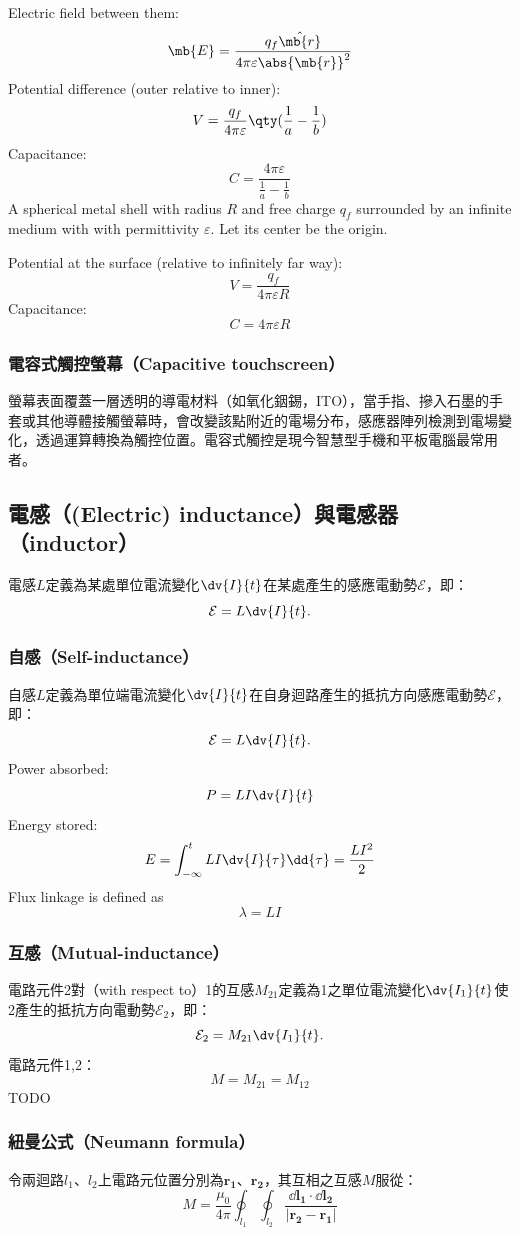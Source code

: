 \documentclass[a4paper,12pt]{report}
\begin{document}
\begin{itemize}
Electric field between them:
\[\mb{E}=\frac{q_f\hat{\mb{r}}}{4\pi\varepsilon\abs{\mb{r}}^2}\]
Potential difference (outer relative to inner):
\[V=\frac{q_f}{4\pi\varepsilon}\qty(\frac{1}{a}-\frac{1}{b})\]
Capacitance:
\[C=\frac{4\pi\varepsilon}{\frac{1}{a}-\frac{1}{b}}\]
A spherical metal shell with radius $R$ and free charge $q_f$ surrounded by an infinite medium with with permittivity $\varepsilon$. Let its center be the origin.

Potential at the surface (relative to infinitely far way):
\[V=\frac{q_f}{4\pi\varepsilon R}\]
Capacitance:
\[C=4\pi\varepsilon R\]
\subsubsection{電容式觸控螢幕（Capacitive touchscreen）}
螢幕表面覆蓋一層透明的導電材料（如氧化銦錫，ITO），當手指、摻入石墨的手套或其他導體接觸螢幕時，會改變該點附近的電場分布，感應器陣列檢測到電場變化，透過運算轉換為觸控位置。電容式觸控是現今智慧型手機和平板電腦最常用者。
\subsection{電感（(Electric) inductance）與電感器（inductor）}
電感$L$定義為某處單位電流變化$\dv{I}{t}$在某處產生的感應電動勢$\mathcal{E}$，即：
\[\mathcal{E}=L\dv{I}{t}.\]
\subsubsection{自感（Self-inductance）}
自感$L$定義為單位端電流變化$\dv{I}{t}$在自身迴路產生的抵抗方向感應電動勢$\mathcal{E}$，即：
\[\mathcal{E}=L\dv{I}{t}.\]
Power absorbed:
\[P=LI\dv{I}{t}\]
Energy stored:
\[E=\int_{-\infty}^tLI\dv{I}{\tau}\dd{\tau}=\frac{LI^2}{2}\]
Flux linkage is defined as
\[\lambda = LI\]
\subsubsection{互感（Mutual-inductance）}
電路元件2對（with respect to）1的互感$M_{21}$定義為1之單位電流變化$\dv{I_1}{t}$使2產生的抵抗方向電動勢$\mathcal{E}_2$，即：
\[\mathcal{E}_2=M_{21}\dv{I_1}{t}.\]
電路元件1,2：
\[M=M_{21}=M_{12}\]
\bpr
TODO
\epr
\subsubsection{紐曼公式（Neumann formula）}
令兩迴路$l_1$、$l_2$上電路元位置分別為$\mathbf{r_1}$、$\mathbf{r_2}$，其互相之互感$M$服從：
\[M=\frac{\mu_0}{4\pi}\oint_{l_1}\oint_{l_2}\frac{\dd\mathbf{l_1}\cdot\dd\mathbf{l_2}}{|\mathbf{r_2}-\mathbf{r_1}|}\]

\end{itemize}
\end{document}
